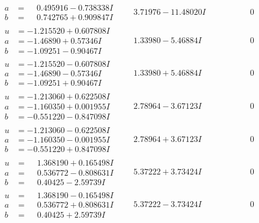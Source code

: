 \documentclass[1p]{elsarticle_modified}
\theoremstyle{definition}
\begin{document}
$$\begin{array}{c|c|c}
\begin{aligned}
a &= \phantom{-}0.495916 - 0.738338 I \\
b &= \phantom{-}0.742765 + 0.909847 I\end{aligned}
 & \phantom{-}3.71976 - 11.48020 I & \phantom{-0.000000 } 0 \\ \hline\begin{aligned}
u &= -1.215520 + 0.607808 I \\
a &= -1.46890 + 0.57346 I \\
b &= -1.09251 - 0.90467 I\end{aligned}
 & \phantom{-}1.33980 - 5.46884 I & \phantom{-0.000000 } 0 \\ \hline\begin{aligned}
u &= -1.215520 - 0.607808 I \\
a &= -1.46890 - 0.57346 I \\
b &= -1.09251 + 0.90467 I\end{aligned}
 & \phantom{-}1.33980 + 5.46884 I & \phantom{-0.000000 } 0 \\ \hline\begin{aligned}
u &= -1.213060 + 0.622508 I \\
a &= -1.160350 + 0.001955 I \\
b &= -0.551220 - 0.847098 I\end{aligned}
 & \phantom{-}2.78964 - 3.67123 I & \phantom{-0.000000 } 0 \\ \hline\begin{aligned}
u &= -1.213060 - 0.622508 I \\
a &= -1.160350 - 0.001955 I \\
b &= -0.551220 + 0.847098 I\end{aligned}
 & \phantom{-}2.78964 + 3.67123 I & \phantom{-0.000000 } 0 \\ \hline\begin{aligned}
u &= \phantom{-}1.368190 + 0.165498 I \\
a &= \phantom{-}0.536772 - 0.808631 I \\
b &= \phantom{-}0.40425 - 2.59739 I\end{aligned}
 & \phantom{-}5.37222 + 3.73424 I & \phantom{-0.000000 } 0 \\ \hline\begin{aligned}
u &= \phantom{-}1.368190 - 0.165498 I \\
a &= \phantom{-}0.536772 + 0.808631 I \\
b &= \phantom{-}0.40425 + 2.59739 I\end{aligned}
 & \phantom{-}5.37222 - 3.73424 I & \phantom{-0.000000 } 0 \\ \hline\begin{aligned}

\end{aligned}
\end{array}$$
\end{document}
